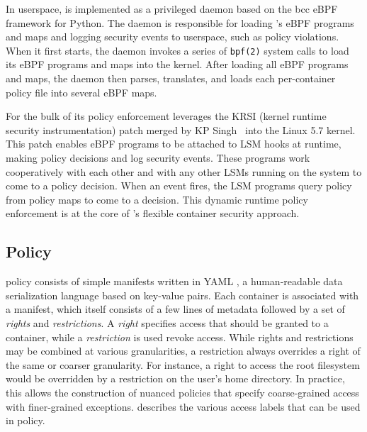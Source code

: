 In userspace, \bpfcontain{} is implemented as a privileged daemon based on the bcc \cite{bcc} eBPF framework for Python. The daemon is responsible for loading \bpfcontain{}'s eBPF programs and maps and logging security events to userspace, such as policy violations.  When it first starts, the daemon invokes a series of \texttt{bpf(2)} system calls to load its eBPF programs and maps into the kernel. After loading all eBPF programs and maps, the daemon then parses, translates, and loads each per-container policy file into several eBPF maps.

For the bulk of its policy enforcement \bpfcontain{} leverages the KRSI (kernel runtime security instrumentation) patch merged by KP Singh~\cite{singh2019_krsi,corbet2019_krsi} into the Linux 5.7 kernel. This patch enables eBPF programs to be attached to LSM hooks at runtime, making policy decisions and log security events.  These programs work cooperatively with each other and with any other LSMs running on the system to come to a policy decision. When an event fires, the LSM programs query policy from policy maps to come to a decision. This dynamic runtime policy enforcement is at the core of \bpfcontain{}'s flexible container security approach.

\subsection{\bpfcontain{} Policy}
\label{sub:policy}

\bpfcontain{} policy consists of simple manifests written in YAML \cite{yaml}, a human-readable data serialization language based on key-value pairs.  Each \bpfcontain{} container is associated with a manifest, which itself consists of a few lines of metadata followed by a set of \textit{rights} and \textit{restrictions}.  A \textit{right} specifies access that should be granted to a container, while a \textit{restriction} is used revoke access. While rights and restrictions may be combined at various granularities, a restriction always overrides a right of the same or coarser granularity. For instance, a right to access the root filesystem would be overridden by a restriction on the user's home directory. In practice, this allows the construction of nuanced policies that specify coarse-grained access with finer-grained exceptions.   describes the various access labels that can be used in \bpfcontain{} policy.

